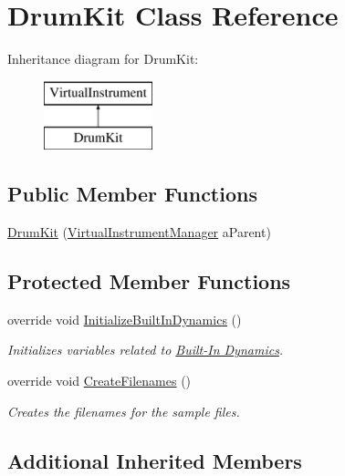 \hypertarget{class_drum_kit}{}\section{Drum\+Kit Class Reference}
\label{class_drum_kit}
Inheritance diagram for Drum\+Kit\+:\begin{figure}[H]
\begin{center}
\leavevmode
\includegraphics[height=2.000000cm]{class_drum_kit}
\end{center}
\end{figure}
\subsection*{Public Member Functions}
\begin{DoxyCompactItemize}
\item 
\hyperlink{class_drum_kit_abade574e7f9d5684653c0b33524362a7}{Drum\+Kit} (\hyperlink{class_virtual_instrument_manager}{Virtual\+Instrument\+Manager} a\+Parent)
\end{DoxyCompactItemize}
\subsection*{Protected Member Functions}
\begin{DoxyCompactItemize}
\item 
override void \hyperlink{class_drum_kit_ad14c6155e6ec62f26a30261e273d6379}{Initialize\+Built\+In\+Dynamics} ()
\begin{DoxyCompactList}\small\item\em Initializes variables related to \hyperlink{group___audio_DefBID}{Built-\/\+In Dynamics}. \end{DoxyCompactList}\item 
override void \hyperlink{class_drum_kit_a25bb92cf56bc1b3434465faf73cd09cf}{Create\+Filenames} ()
\begin{DoxyCompactList}\small\item\em Creates the filenames for the sample files. \end{DoxyCompactList}\end{DoxyCompactItemize}
\subsection*{Additional Inherited Members}


